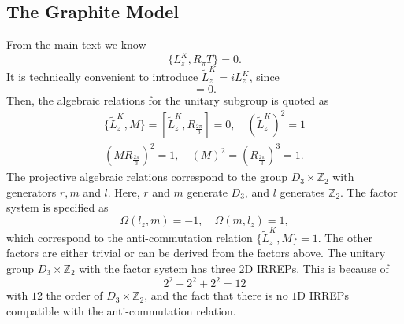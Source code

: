 \documentclass[aps,prl,twocolumn,noshowpacs,superscriptaddress]{revtex4-1}
\def \Z {\mathbb{Z}}
\begin{document}
\subsection{The Graphite Model}
From the main text we know
\begin{equation}
	\{L_z^K,R_\pi T\}=0.
\end{equation}
It is technically convenient to introduce $\tilde{L}_z^K=iL_z^K$, since 
\begin{equation}
	[\tilde{L}_z^K,R_\pi T]=0.
\end{equation}
Then, the algebraic relations for the unitary subgroup is quoted as
\begin{gather}\label{Graphite_relation}
	\{\tilde{L}_z^K, M\}=[\tilde{L}_z^K,  R_{\frac{2\pi}{3}}]=0,\quad (\tilde{L}_z^K)^2=1 \nonumber\\ (MR_{\frac{2\pi}{3}})^2=1,\quad  (M)^2=(R_{\frac{2\pi}{3}})^3=1.
\end{gather}
The projective algebraic relations correspond to the group $D_3\times \mathbb{Z}_2$ with generators $r,m$ and $l$. Here, $r$ and $m$ generate $D_3$, and $l$ generates $\Z_2$. The factor system is specified as
\begin{equation}
	\Omega(l_z,m)=-1,\quad \Omega(m,l_z)=1,
\end{equation}
which correspond to the anti-commutation relation $\{\tilde{L}_z^K, M\}=1$. The other factors are either trivial or can be derived from the factors above. The unitary group $D_3\times \mathbb{Z}_2$ with the factor system has three $2$D IRREPs. This is because of
\begin{equation}
	2^2+2^2+2^2=12
\end{equation}
with $12$ the order of $D_3\times \mathbb{Z}_2$, and the fact that there is no $1$D IRREPs compatible with the anti-commutation relation.
\end{document}
